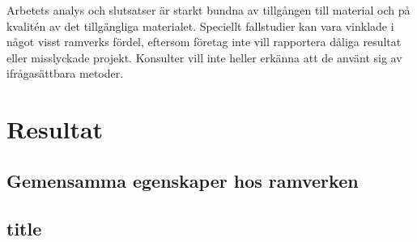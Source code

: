 Arbetets analys och slutsatser är starkt bundna av tillgången till material och på kvalitén av det tillgängliga materialet. Speciellt fallstudier kan vara vinklade i något visst ramverks fördel, eftersom företag inte vill rapportera dåliga resultat eller misslyckade projekt. Konsulter vill inte heller erkänna att de använt sig av ifrågasättbara metoder.

\newpage

\section{Resultat}

\subsection{Gemensamma egenskaper hos ramverken}

\subsection{title}
